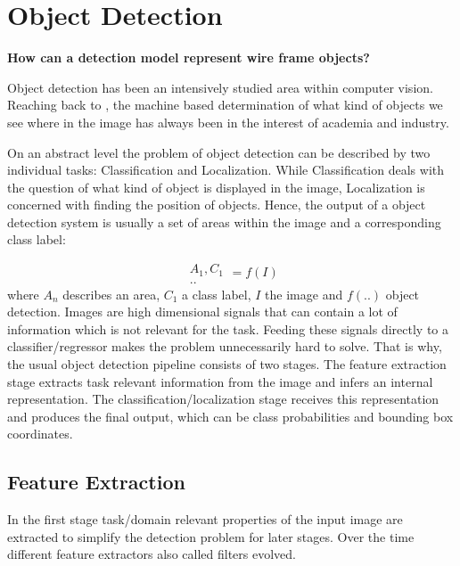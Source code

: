 	\chapter{Object Detection}
	
	\label{sec:object_detection}
	
	\begin{center}
		\textbf{ How can a detection model represent wire frame objects?}
	\end{center}
	
	
	Object detection has been an intensively studied area within computer vision. Reaching back to , the machine based determination of what kind of objects we see where in the image has always been in the interest of academia and industry.
	
	On an abstract level the problem of object detection can be described by two individual tasks: Classification and Localization. While Classification deals with the question of what kind of object is displayed in the image, Localization is concerned with finding the position of objects. Hence, the output of a object detection system is usually a set of areas within the image and a corresponding class label:
	
	$$
	\begin{matrix}
	A_1, C_1\\
	..
	\end{matrix} = f(I)
	$$
	where $A_n$ describes an area, $C_1$ a class label, $I$ the image and $f(..)$ object detection.
	Images are high dimensional signals that can contain a lot of information which is not relevant for the task. Feeding these signals directly to a classifier/regressor makes the problem unnecessarily hard to solve. That is why, the usual object detection pipeline consists of two stages. The feature extraction stage extracts task relevant information from the image and infers an internal representation. The classification/localization stage receives this representation and produces the final output, which can be class probabilities and bounding box coordinates.
	
	\section{Feature Extraction}
	
	In the first stage task/domain relevant properties of the input image are extracted to simplify the detection problem for later stages. Over the time different feature extractors also called filters evolved.
	
